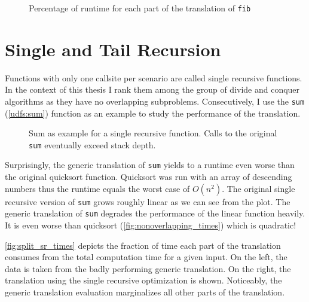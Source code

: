 \begin{figure}[h!]
    \centering\small
    
    \caption{Percentage of runtime for each part of the translation of \texttt{fib}}
    \label{fig:split_times}
\end{figure}


\iffalse
\begin{figure}[h]
    \centering\small
    
    \caption{Impact of the number of scenarios on the runtime. Single recursive function with expensive predicates}
    \label{fig:recn_times}
\end{figure}

Impact of number of scenarios (Overhead by predicates) \autoref{fig:recn_times}

\fi




\section{Single and Tail Recursion}

Functions with only one callsite per scenario are called single recursive functions. In the context of this thesis I rank them among the group of divide and conquer algorithms as they have no overlapping subproblems. Consecutively, I use the \texttt{sum} (\autoref{udfs:sum}) function as an example to study the performance of the translation.

\begin{figure}[h!]
    \centering\small
    
    \caption{Sum as example for a single recursive function. Calls to the original \texttt{sum} eventually exceed stack depth.}
    \label{fig:factorial_times}
\end{figure}


Surprisingly, the generic translation of \texttt{sum} yields to a runtime even worse than the original quicksort function. Quicksort was run with an array of descending numbers thus the runtime equals the worst case of $O(n^2)$. The original single recursive version of \texttt{sum} grows roughly linear as we can see from the plot. The generic translation of \texttt{sum} degrades the performance of the linear function heavily. It is even worse than quicksort (\autoref{fig:nonoverlapping_times}) which is quadratic!

\autoref{fig:split_sr_times} depicts the fraction of time each part of the translation consumes from the total computation time for a given input. On the left, the data is taken from the badly performing generic translation. On the right, the translation using the single recursive optimization is shown. Noticeably, the generic translation evaluation marginalizes all other parts of the translation.

